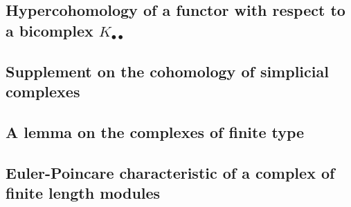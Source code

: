 \subsection{Hypercohomology of a functor with respect to a bicomplex $K_{\bullet\bullet}$}
\label{subsection:0.11.7}

\subsection{Supplement on the cohomology of simplicial complexes}
\label{subsection:0.11.8}

\subsection{A lemma on the complexes of finite type}
\label{subsection:0.11.9}

\subsection{Euler-Poincare characteristic of a complex of finite length modules}
\label{subsection:0.11.10}